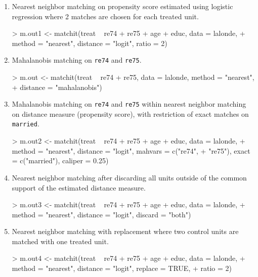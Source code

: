 \documentclass[oneside,letterpaper,titlepage]{article}
\begin{document}
\begin{enumerate}

\item Nearest neighbor matching on propensity score estimated using
  logistic regression where 2 matches are chosen for each treated unit.
\begin{Schunk}
\begin{Sinput}
> m.out1 <- matchit(treat ~ re74 + re75 + age + educ, data = lalonde, 
+     method = "nearest", distance = "logit", ratio = 2)
\end{Sinput}
\end{Schunk}

\item Mahalanobis matching on {\tt re74} and {\tt re75}.
\begin{Schunk}
\begin{Sinput}
> m.out <- matchit(treat ~ re74 + re75, data = lalonde, method = "nearest", 
+     distance = "mahalanobis")
\end{Sinput}
\end{Schunk}

\item Mahalanobis matching on {\tt re74} and {\tt re75} within nearest
  neighbor matching on distance measure (propensity score), with restriction of exact
  matches on {\tt married}.
\begin{Schunk}
\begin{Sinput}
> m.out2 <- matchit(treat ~ re74 + re75 + age + educ, data = lalonde, 
+     method = "nearest", distance = "logit", mahvars = c("re74", 
+         "re75"), exact = c("married"), caliper = 0.25)
\end{Sinput}
\end{Schunk}

\item Nearest neighbor matching after discarding all units outside of
  the common support of the estimated distance measure.
\begin{Schunk}
\begin{Sinput}
> m.out3 <- matchit(treat ~ re74 + re75 + age + educ, data = lalonde, 
+     method = "nearest", distance = "logit", discard = "both")
\end{Sinput}
\end{Schunk}

\item Nearest neighbor matching with replacement where two control
  units are matched with one treated unit.
\begin{Schunk}
\begin{Sinput}
> m.out4 <- matchit(treat ~ re74 + re75 + age + educ, data = lalonde, 
+     method = "nearest", distance = "logit", replace = TRUE, 
+     ratio = 2)
\end{Sinput}
\end{Schunk}


\end{enumerate}
\end{document}
